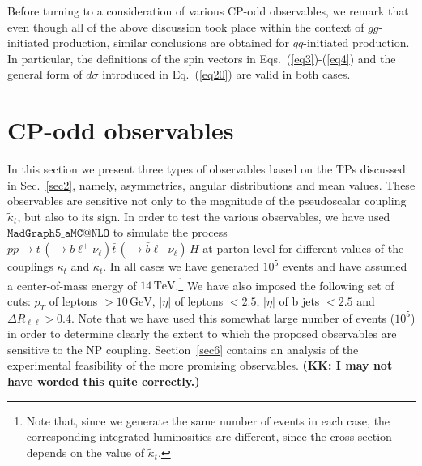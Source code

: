 \documentclass[aps,preprint,tightenlines,floatfix,superscriptaddress,nofootinbib,showpacs]{revtex4-1}
\def\tbar{\bar{t}}
\def\bbar{\bar{b}}
\def\qbar{\bar{q}}
\def\nubar{{\bar{\nu}}_{\ell}}
\def\ppprocess{pp\to t\,\left(\rightarrow b {\ell}^+ \nu_{\ell}\right) \tbar\,\left(\rightarrow\bbar {\ell}^-\nubar\right)\,H}
\def\kp{\kappa_t}
\def\kpt{\tilde{\kappa}_t}
\begin{document}
Before turning to a consideration of various CP-odd observables,
we remark that even though all of the above discussion took place
within the context of $gg$-initiated production, similar conclusions
are obtained for $q\qbar$-initiated production. In particular, the
definitions of the spin vectors in Eqs.~(\ref{eq3})-(\ref{eq4}) and
the general form of $d\sigma$ introduced in Eq.~(\ref{eq20}) are valid
in both cases.
\bigskip
\section{$\mathrm{\mathbf{CP}}$-odd observables}
\label{sec3}
In this section we present three types of observables based on the TPs discussed
in Sec.~\ref{sec2}, namely, asymmetries, angular
distributions and mean values. These observables are sensitive not only to the
magnitude of the pseudoscalar coupling $\kpt$, but also to its
sign.  In order to test the various observables, we have
used $\mathtt{MadGraph5\_aMC@NLO}$ \cite{Madgraph} to simulate the process
$\ppprocess$ at parton level for different values of the couplings
$\kp$ and $\kpt$.  In all cases we have generated $10^5$ events
and have assumed a center-of-mass energy of
$14\,\mathrm{TeV}$.\footnote{Note that, since we generate
  the same number of events in
  each case, the corresponding integrated luminosities are different, since the
  cross section depends on the value of $\kpt$.}
We have also imposed the
following set of cuts: $p_T$ of leptons $> 10\,\mathrm{GeV}$, $|\eta|$
of leptons $< 2.5$, $|\eta|$ of b jets $< 2.5$ and $\Delta
R_{\ell\ell}>0.4$.  Note that we have used this
somewhat large number of events ($10^5$) in order to determine clearly
the extent to which the proposed observables are sensitive to the NP
coupling.  Section~\ref{sec6} contains an
analysis of the experimental feasibility of the more promising observables.
{\bf (KK: I may not have worded this quite correctly.)}
\end{document}
